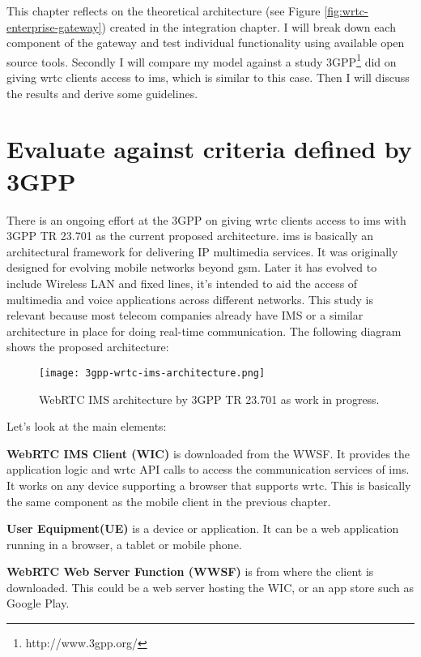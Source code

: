 
This chapter reflects on the theoretical architecture (see Figure \ref{fig:wrtc-enterprise-gateway}) created in the integration chapter. I will break down each component of the gateway and test individual functionality using available open source tools. Secondly I will compare my model against a study 3GPP\footnote{http://www.3gpp.org/} did on giving \gls{wrtc} clients access to \gls{ims}, which is similar to this case. Then I will discuss the results and derive some guidelines.


\section{Evaluate against criteria defined by 3GPP}
There is an ongoing effort at the 3GPP on giving \gls{wrtc} clients access to \gls{ims} with 3GPP TR 23.701\cite{3gpp-wrtc-access-ims} as the current proposed architecture. \gls{ims} is basically an architectural framework for delivering IP multimedia services. It was originally designed for evolving mobile networks beyond \gls{gsm}. Later it has evolved to include Wireless LAN and fixed lines, it's intended to aid the access of multimedia and voice applications across different networks. This study is relevant because most telecom companies already have IMS or a similar architecture in place for doing real-time communication. The following diagram shows the proposed architecture:

\begin{figure}[here]
\centerline{\texttt{[image: 3gpp-wrtc-ims-architecture.png]}}
\caption{WebRTC IMS architecture by 3GPP TR 23.701 as work in progress.}
\label{fig:wrtc-ims-architecture}
\end{figure}

Let's look at the main elements:

\textbf{WebRTC IMS Client (WIC)}
is downloaded from the WWSF. It provides the application logic and \gls{wrtc} API calls to access the communication services of \gls{ims}. It works on any device supporting a browser that supports \gls{wrtc}. This is basically the same component as the mobile client in the previous chapter.

\textbf{User Equipment(UE)}
is a device or application. It can be a web application running in a browser, a tablet or mobile phone.

\textbf{WebRTC Web Server Function (WWSF)}
is from where the client is downloaded. This could be a web server hosting the WIC, or an app store such as Google Play.

